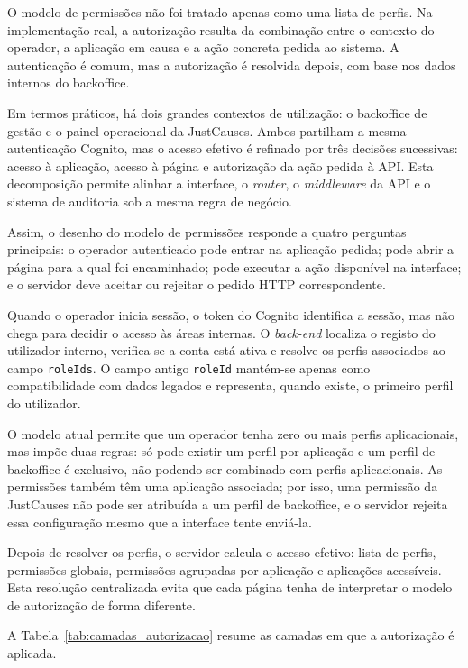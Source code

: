 O modelo de permissões não foi tratado apenas como uma lista de perfis. Na implementação real, a autorização resulta da combinação entre o contexto do operador, a aplicação em causa e a ação concreta pedida ao sistema. A autenticação é comum, mas a autorização é resolvida depois, com base nos dados internos do backoffice.

Em termos práticos, há dois grandes contextos de utilização: o backoffice de gestão e o painel operacional da JustCauses. Ambos partilham a mesma autenticação Cognito, mas o acesso efetivo é refinado por três decisões sucessivas: acesso à aplicação, acesso à página e autorização da ação pedida à \gls{API}. Esta decomposição permite alinhar a interface, o \textit{router}, o \textit{middleware} da \gls{API} e o sistema de auditoria sob a mesma regra de negócio.

Assim, o desenho do modelo de permissões responde a quatro perguntas principais: o operador autenticado pode entrar na aplicação pedida; pode abrir a página para a qual foi encaminhado; pode executar a ação disponível na interface; e o servidor deve aceitar ou rejeitar o pedido \gls{HTTP} correspondente.

Quando o operador inicia sessão, o token do Cognito identifica a sessão, mas não chega para decidir o acesso às áreas internas. O \textit{back-end} localiza o registo do utilizador interno, verifica se a conta está ativa e resolve os perfis associados ao campo \texttt{roleIds}. O campo antigo \texttt{roleId} mantém-se apenas como compatibilidade com dados legados e representa, quando existe, o primeiro perfil do utilizador.

O modelo atual permite que um operador tenha zero ou mais perfis aplicacionais, mas impõe duas regras: só pode existir um perfil por aplicação e um perfil de backoffice é exclusivo, não podendo ser combinado com perfis aplicacionais. As permissões também têm uma aplicação associada; por isso, uma permissão da JustCauses não pode ser atribuída a um perfil de backoffice, e o servidor rejeita essa configuração mesmo que a interface tente enviá-la.

Depois de resolver os perfis, o servidor calcula o acesso efetivo: lista de perfis, permissões globais, permissões agrupadas por aplicação e aplicações acessíveis. Esta resolução centralizada evita que cada página tenha de interpretar o modelo de autorização de forma diferente.

A Tabela~\ref{tab:camadas_autorizacao} resume as camadas em que a autorização é aplicada.

